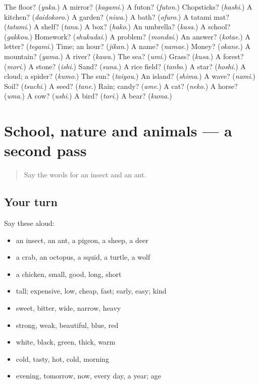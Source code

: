 \begin{tcolorbox}[breakable,colback=teal!4,colframe=teal!35!black,title={Before you move on}]
The floor? (\emph{yuka}.) A mirror? (\emph{kagami}.) A futon? (\emph{futon}.) Chopsticks? (\emph{hashi}.) A kitchen? (\emph{daidokoro}.) A garden? (\emph{niwa}.) A bath? (\emph{ofuro}.) A tatami mat? (\emph{tatami}.) A shelf? (\emph{tana}.) A box? (\emph{hako}.) An umbrella? (\emph{kasa}.) A school? (\emph{gakkou}.) Homework? (\emph{shukudai}.) A problem? (\emph{mondai}.) An answer? (\emph{kotae}.) A letter? (\emph{tegami}.) Time; an hour? (\emph{jikan}.) A name? (\emph{namae}.) Money? (\emph{okane}.) A mountain? (\emph{yama}.) A river? (\emph{kawa}.) The sea? (\emph{umi}.) Grass? (\emph{kusa}.) A forest? (\emph{mori}.) A stone? (\emph{ishi}.) Sand? (\emph{suna}.) A rice field? (\emph{tanbo}.) A star? (\emph{hoshi}.) A cloud; a spider? (\emph{kumo}.) The sun? (\emph{taiyou}.) An island? (\emph{shima}.) A wave? (\emph{nami}.) Soil? (\emph{tsuchi}.) A seed? (\emph{tane}.) Rain; candy? (\emph{ame}.) A cat? (\emph{neko}.) A horse? (\emph{uma}.) A cow? (\emph{ushi}.) A bird? (\emph{tori}.) A bear? (\emph{kuma}.)
\end{tcolorbox}
\section[(dialogue)]{School, nature and animals — a second pass}

\label{lesson:JA-R54-second-pass-school-nature-and-animals}



\begin{quote}
Say the words for an insect and an ant.
\end{quote}

\subsection*{Your turn}
Say these aloud:

\begin{itemize}
\raggedright
  \item an insect, an ant, a pigeon, a sheep, a deer
  \item a crab, an octopus, a squid, a turtle, a wolf
  \item a chicken, small, good, long, short
  \item tall; expensive, low, cheap, fast; early, easy; kind
  \item sweet, bitter, wide, narrow, heavy
  \item strong, weak, beautiful, blue, red
  \item white, black, green, thick, warm
  \item cold, tasty, hot, cold, morning
  \item evening, tomorrow, now, every day, a year; age
\end{itemize}

